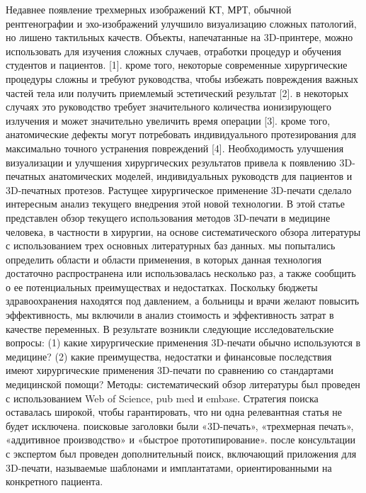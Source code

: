 Недавнее появление трехмерных
изображений КТ, МРТ, обычной рентгенографии и эхо-изображений улучшило
визуализацию сложных патологий, но лишено тактильных качеств. Объекты,
напечатанные на 3D-принтере, можно использовать для изучения сложных случаев,
отработки процедур и обучения студентов и пациентов. [1]. кроме того, некоторые
современные хирургические процедуры сложны и требуют руководства, чтобы избежать
повреждения важных частей тела или получить приемлемый эстетический результат
[2]. в некоторых случаях это руководство требует значительного количества
ионизирующего излучения и может значительно увеличить время операции [3]. кроме
того, анатомические дефекты могут потребовать индивидуального протезирования для
максимально точного устранения повреждений [4]. Необходимость улучшения
визуализации и улучшения хирургических результатов привела к появлению
3D-печатных анатомических моделей, индивидуальных руководств для пациентов и
3D-печатных протезов. Растущее хирургическое применение 3D-печати сделало
интересным анализ текущего внедрения этой новой технологии. В этой статье
представлен обзор текущего использования методов 3D-печати в медицине человека,
в частности в хирургии, на основе систематического обзора литературы с
использованием трех основных литературных баз данных. мы попытались определить
области и области применения, в которых данная технология достаточно
распространена или использовалась несколько раз, а также сообщить о ее
потенциальных преимуществах и недостатках. Поскольку бюджеты здравоохранения
находятся под давлением, а больницы и врачи желают повысить эффективность, мы
включили в анализ стоимость и эффективность затрат в качестве переменных. В
результате возникли следующие исследовательские вопросы: (1) какие хирургические
применения 3D-печати обычно используются в медицине? (2) какие преимущества,
недостатки и финансовые последствия имеют хирургические применения 3D-печати по
сравнению со стандартами медицинской помощи? Методы: систематический обзор
литературы был проведен с использованием Web of Science, pub med и embase.
Стратегия поиска оставалась широкой, чтобы гарантировать, что ни одна
релевантная статья не будет исключена. поисковые заголовки были «3D-печать»,
«трехмерная печать», «аддитивное производство» и «быстрое прототипирование».
после консультации с экспертом был проведен дополнительный поиск, включающий
приложения для 3D-печати, называемые шаблонами и имплантатами, ориентированными
на конкретного пациента.

